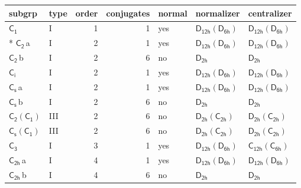 \documentclass[10pt,a4paper]{article}
\numberwithin{equation}{section}
\newcommand{\grp}[1]{\mathsf{#1}}
\newcommand{\clsletter}[1]{\,{\scriptsize\color{black!55}#1}}
\begin{document}
{\small\begin{longtable}{@{}llrrlll@{}}\toprule
subgrp & type & order & conjugates & normal & normalizer & centralizer\\\midrule\endhead
\bottomrule\endfoot\endlastfoot
\href{../../../rotation/data/pdf/C1.pdf}{$\grp{C_{1}}$} & I & 1 & 1 & yes & \href{D12h-D6h.pdf}{$\grp{D_{12h}}(\grp{D_{6h}})$} & \href{D12h-D6h.pdf}{$\grp{D_{12h}}(\grp{D_{6h}})$}\\*
\href{../../../rotation/data/pdf/C2.pdf}{$\grp{C_{2}}$}\clsletter{a} & I & 2 & 1 & yes & \href{D12h-D6h.pdf}{$\grp{D_{12h}}(\grp{D_{6h}})$} & \href{D12h-D6h.pdf}{$\grp{D_{12h}}(\grp{D_{6h}})$}\\
\href{../../../rotation/data/pdf/C2.pdf}{$\grp{C_{2}}$}\clsletter{b} & I & 2 & 6 & no & \href{../../../rotation/data/pdf/D2h.pdf}{$\grp{D_{2h}}$} & \href{../../../rotation/data/pdf/D2h.pdf}{$\grp{D_{2h}}$}\\
\href{../../../rotation/data/pdf/S2.pdf}{$\grp{C_{i}}$} & I & 2 & 1 & yes & \href{D12h-D6h.pdf}{$\grp{D_{12h}}(\grp{D_{6h}})$} & \href{D12h-D6h.pdf}{$\grp{D_{12h}}(\grp{D_{6h}})$}\\
\href{../../../rotation/data/pdf/C1v.pdf}{$\grp{C_{s}}$}\clsletter{a} & I & 2 & 1 & yes & \href{D12h-D6h.pdf}{$\grp{D_{12h}}(\grp{D_{6h}})$} & \href{D12h-D6h.pdf}{$\grp{D_{12h}}(\grp{D_{6h}})$}\\
\href{../../../rotation/data/pdf/C1v.pdf}{$\grp{C_{s}}$}\clsletter{b} & I & 2 & 6 & no & \href{../../../rotation/data/pdf/D2h.pdf}{$\grp{D_{2h}}$} & \href{../../../rotation/data/pdf/D2h.pdf}{$\grp{D_{2h}}$}\\
\href{C2-C1.pdf}{$\grp{C_{2}}(\grp{C_{1}})$} & III & 2 & 6 & no & \href{D2h-C2h.pdf}{$\grp{D_{2h}}(\grp{C_{2h}})$} & \href{D2h-C2h.pdf}{$\grp{D_{2h}}(\grp{C_{2h}})$}\\
\href{C1v-C1.pdf}{$\grp{C_{s}}(\grp{C_{1}})$} & III & 2 & 6 & no & \href{D2h-C2h.pdf}{$\grp{D_{2h}}(\grp{C_{2h}})$} & \href{D2h-C2h.pdf}{$\grp{D_{2h}}(\grp{C_{2h}})$}\\
\href{../../../rotation/data/pdf/C3.pdf}{$\grp{C_{3}}$} & I & 3 & 1 & yes & \href{D12h-D6h.pdf}{$\grp{D_{12h}}(\grp{D_{6h}})$} & \href{C12h-C6h.pdf}{$\grp{C_{12h}}(\grp{C_{6h}})$}\\
\href{../../../rotation/data/pdf/C2h.pdf}{$\grp{C_{2h}}$}\clsletter{a} & I & 4 & 1 & yes & \href{D12h-D6h.pdf}{$\grp{D_{12h}}(\grp{D_{6h}})$} & \href{D12h-D6h.pdf}{$\grp{D_{12h}}(\grp{D_{6h}})$}\\
\href{../../../rotation/data/pdf/C2h.pdf}{$\grp{C_{2h}}$}\clsletter{b} & I & 4 & 6 & no & \href{../../../rotation/data/pdf/D2h.pdf}{$\grp{D_{2h}}$} & \href{../../../rotation/data/pdf/D2h.pdf}{$\grp{D_{2h}}$}\\

\end{longtable}}
\end{document}
